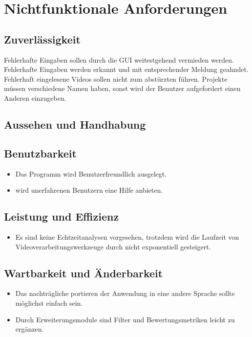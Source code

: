 \chapter{Nichtfunktionale Anforderungen}
\section{Zuverlässigkeit}
\setcounter{counterKriterien}{0}
 Fehlerhafte Eingaben sollen durch die GUI weitestgehend vermieden werden.
 Fehlerhafte Eingaben werden erkannt und mit entsprechender Meldung geahndet.
 Fehlerhaft eingelesene Videos sollen nicht zum abstürzten führen.
 Projekte müssen verschiedene Namen haben, sonst wird der Benutzer aufgefordert einen Anderen einzugeben.
\section{Aussehen und Handhabung} %
\section{Benutzbarkeit}
\begin{itemize}
\item Das Programm wird Benutzerfreundlich ausgelegt.
\item \projektTitel wird unerfahrenen Benutzern eine Hilfe anbieten.
\end{itemize}
\section{Leistung und Effizienz}
\begin{itemize}
\item Es sind keine Echtzeitanalysen vorgesehen, trotzdem wird die Laufzeit von Videoverarbeitungswerkzeuge durch \projektTitel nicht exponentiell gesteigert.
\end{itemize}
\section{Wartbarkeit und Änderbarkeit}
\begin{itemize}
\item Das nachträgliche portieren der Anwendung in eine andere Sprache sollte möglichst einfach sein.
\item Durch Erweiterungsmodule sind Filter und Bewertungsmetriken leicht zu ergänzen.
\end{itemize}